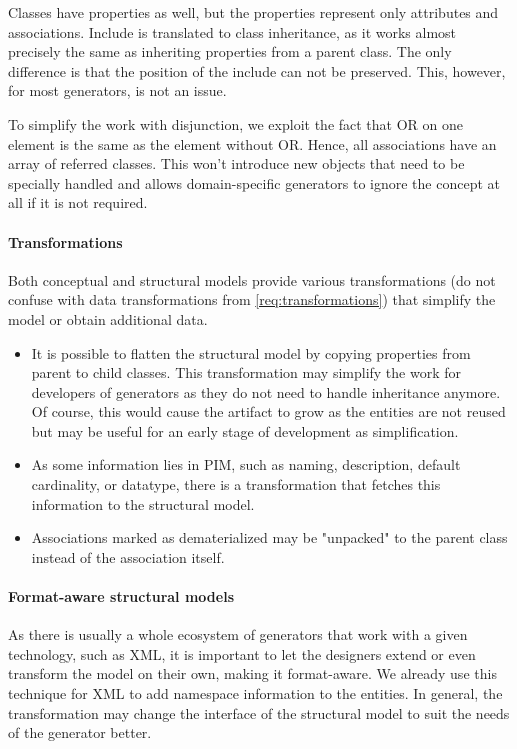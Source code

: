 Classes have properties as well, but the properties represent only attributes and associations. Include is translated to class inheritance, as it works almost precisely the same as inheriting properties from a parent class. The only difference is that the position of the include can not be preserved. This, however, for most generators, is not an issue.

To simplify the work with disjunction, we exploit the fact that OR on one element is the same as the element without OR. Hence, all associations have an array of referred classes. This won't introduce new objects that need to be specially handled and allows domain-specific generators to ignore the concept at all if it is not required.

\paragraph{Transformations} Both conceptual and structural models provide various transformations (do not confuse with data transformations from \autoref{req:transformations}) that simplify the model or obtain additional data.

\begin{itemize}
    \item It is possible to flatten the structural model by copying properties from parent to child classes. This transformation may simplify the work for developers of generators as they do not need to handle inheritance anymore. Of course, this would cause the artifact to grow as the entities are not reused but may be useful for an early stage of development as simplification.
    \item As some information lies in PIM, such as naming, description, default cardinality, or datatype, there is a transformation that fetches this information to the structural model.
    \item Associations marked as dematerialized may be "unpacked" to the parent class instead of the association itself.
\end{itemize}

\paragraph{Format-aware structural models} As there is usually a whole ecosystem of generators that work with a given technology, such as XML, it is important to let the designers extend or even transform the model on their own, making it format-aware. We already use this technique for XML to add namespace information to the entities. In general, the transformation may change the interface of the structural model to suit the needs of the generator better.
